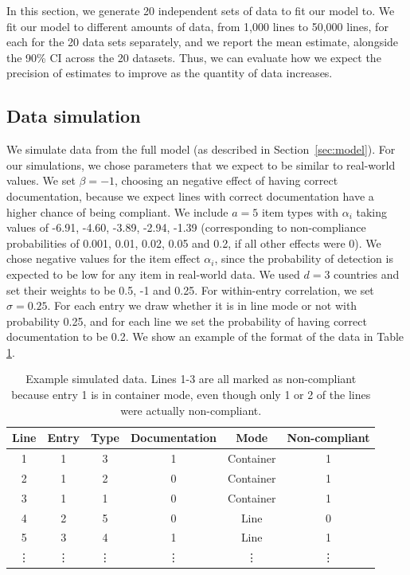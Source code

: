 \documentclass[aoas]{imsart}
\begin{document}
In this section, we generate 20 independent sets of data to fit our model to. We fit our model to different amounts of data, from 1,000 lines to 50,000 lines, for each for the 20 data sets separately, and we report the mean estimate, alongside the 90\% CI across the 20 datasets. Thus, we can evaluate how we expect the precision of estimates to improve as the quantity of data increases.

\subsection{Data simulation}
We simulate data from the full model (as described in Section~\ref{sec:model}). For our simulations, we chose parameters that we expect to be similar to real-world values. We set \(\beta=-1\), choosing an negative effect of having correct documentation, because we expect lines with correct documentation have a higher chance of being compliant. We include $a=5$ item types with \(\alpha_i\) taking values of -6.91, -4.60, -3.89, -2.94, -1.39 (corresponding to non-compliance probabilities of 0.001, 0.01, 0.02, 0.05 and 0.2, if all other effects were 0). We chose negative values for the item effect $\alpha_i$, since the probability of detection is expected to be low for any item in real-world data. We used $d=3$ countries and set their weights to be 0.5, -1 and 0.25.
For within-entry correlation, we set \(\sigma = 0.25\). For each entry we draw whether it is in line mode or not with probability 0.25, and for each line we set the probability of having correct documentation to be 0.2. We show an example of the format of the data in Table \ref{table:example_data}.



\vspace{0.1cm}
\begin{table}[h]
\caption{Example simulated data. Lines 1-3 are all marked as non-compliant because entry 1 is in container mode, even though only 1 or 2 of the lines were actually non-compliant.}
\label{table:example_data}
\begin{center}

\begin{tabular}{|c|c|c|c|c|c|}
\hline 
Line & Entry & Type & Documentation & Mode & Non-compliant \\ 
\hline 
1 & 1 & 3 & 1  & Container & 1 \\ 
\hline 
2 & 1 & 2 & 0  & Container & 1 \\ 
\hline 
3 & 1 & 1 & 0 & Container & 1 \\ 
\hline 
4 & 2 & 5 & 0 &Line & 0 \\ 
\hline 
5 & 3 & 4 & 1 &Line & 1 \\ 
\hline 
\vdots & \vdots & \vdots & \vdots & \vdots & \vdots \\ 
\hline 
\end{tabular} 

\end{center}
\end{table}
\end{document}
